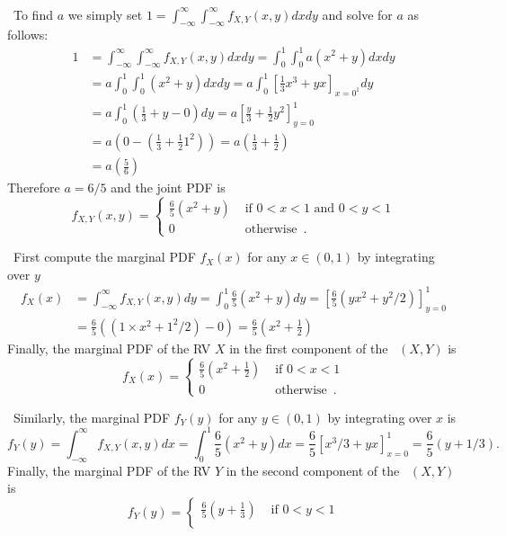 \begin{ExerciseList}
\Answer
~\\
\be
\item~To find $a$ we simply set $1=\int_{-\infty}^{\infty}\int_{-\infty}^{\infty} f_{X,Y}(x,y) dx dy$ and solve for $a$ as follows:
\begin{align*}
1
&=
\int_{-\infty}^{\infty}\int_{-\infty}^{\infty} f_{X,Y}(x,y) dx dy = \int_{0}^{1}\int_{0}^{1} a(x^2+y) dx dy\\
&=
a\int_{0}^{1}\int_{0}^{1} (x^2+y) dx dy = a\int_{0}^{1} \left[ \frac{1}{3}x^3+yx \right]_{x=0^1} dy\\
&=
a\int_{0}^{1} \left( \frac{1}{3}+y - 0 \right) dy = a \left[ \frac{y}{3}+\frac{1}{2}y^2 \right]_{y=0}^{1}\\
&=
a \left( 0-\left(\frac{1}{3}+\frac{1}{2}1^2\right) \right) = a \left( \frac{1}{3}+\frac{1}{2} \right)\\
&=
a \left( \frac{5}{6} \right)
\end{align*}
Therefore $a=6/5$ and the joint PDF is
\[
f_{X,Y}(x,y)
=
\begin{cases}
\frac{6}{5} (x^2+y) & \text{ if } 0 < x < 1 \text{ and } 0 < y < 1\\
0 & \text{ otherwise} \enspace .
\end{cases}
\]
\item~First compute the marginal PDF $f_X(x)$ for any $x \in (0,1)$ by integrating over $y$
\begin{align*}
f_X(x) 
&= \int_{-\infty}^{\infty} f_{X,Y}(x,y) dy
= \int_0^1 \frac{6}{5} (x^2+y) dy 
= \left[ \frac{6}{5} (yx^2+y^2/2) \right]_{y=0}^1\\
&= \frac{6}{5} \left((1 \times x^2 + 1^2/2) - 0 \right)
= \frac{6}{5} \left( x^2 + \frac{1}{2} \right)
\end{align*}
Finally, the marginal PDF of the RV $X$ in the first component of the \rv~$(X,Y)$ is
\[
f_{X}(x)
=
\begin{cases}
\frac{6}{5} \left( x^2 + \frac{1}{2} \right) & \text{ if } 0 < x < 1\\
0 & \text{ otherwise} \enspace .
\end{cases}
\]
\item~Similarly, the marginal PDF $f_Y(y)$ for any $y \in (0,1)$ by integrating over $x$ is 
\[
f_Y(y)=\int_{-\infty}^{\infty} f_{X,Y}(x,y) dx = \int_0^1 \frac{6}{5}(x^2+y) dx = \frac{6}{5} \left[ x^3/3+yx\right]_{x=0}^1 = \frac{6}{5}(y+1/3).
\]
Finally, the marginal PDF of the RV $Y$ in the second component of the \rv~$(X,Y)$ is
\[
f_{Y}(y)
=
\begin{cases}
\frac{6}{5} \left( y + \frac{1}{3} \right) & \text{ if } 0 < y < 1\\

\end{cases}\]
\end{ExerciseList}
